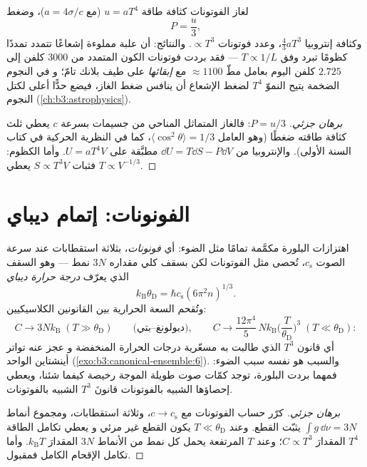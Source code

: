 \begin{proposition}\label{prop:b3:photons-phonons:thermo}
لغاز الفوتونات كثافة طاقة $u = aT^4$ (مع $a =
4\sigma/c$)، وضغط
\[
P = \frac u3 ,
\]
وكثافة إنتروبيا $\tfrac43 aT^3$، وعدد فوتونات $\propto T^3$.
والنتائج: أن علبة مملوءة إشعاعًا تتمدد تمددًا كظومًا
تبرد وفق $T \propto 1/L$ --- فقد بردت فوتونات الكون المتمدد
من $3000$ كلفن إلى $2.725$ كلفن اليوم بعامل مطّ
$\approx1100$ مع \emph{إبقائها} على طيف بلانك تامّ؛ و
في النجوم الضخمة يتيح النموّ $T^4$ لضغط الإشعاع أن ينافس
ضغط الغاز، فيضع حدًّا أعلى لكتل النجوم
(\cref{ch:b3:astrophysics}).
\end{proposition}

\begin{proof}[برهان جزئي]
$P = u/3$: فالغاز المتماثل المناحي من جسيمات بسرعة $c$ يعطي
ثلث كثافة طاقته ضغطًا (وهو العامل $\langle
\cos^2\theta\rangle = 1/3$، كما في النظرية الحركية في كتاب
السنة الأولى). والإنتروبيا من $\dd U = T\dd S - P\dd V$ مطبَّقة على $U =
aT^4V$. وأما الكظوم: فثبات $S \propto T^3V$ يعطي $T \propto
V^{-1/3}$.
\end{proof}

\section{الفونونات: إتمام ديباي}

\begin{theorem}\label{thm:b3:photons-phonons:debye}
اهتزازات البلورة  مكمَّمة تمامًا مثل
الضوء: أي \emph{فونونات}، بثلاثة استقطابات عند سرعة الصوت
$c_{\text{s}}$، تُحصى مثل الفوتونات لكن بسقف كلي مقداره
$3N$ نمط --- وهو السقف الذي يعرّف \emph{درجة حرارة ديباي}
\[
k_{\text{B}}\theta_{\text{D}} = \hbar c_{\text{s}}
(6\pi^2n)^{1/3} .
\]
وتُقحم السعة الحرارية بين القانونين الكلاسيكيين:
\[
C \to 3Nk_{\text{B}} \;(T \gg \theta_{\text{D}})
\qquad\text{(ديولونغ--بتي)} ,
\qquad
C \to \frac{12\pi^4}{5}\,Nk_{\text{B}}
\Big(\frac{T}{\theta_{\text{D}}}\Big)^3
\;(T \ll \theta_{\text{D}}) :
\]
أي قانون $T^3$ الذي طالبت به مسعّرية درجات الحرارة المنخفضة و
عجز عنه تواتر أينشتاين الواحد
(\cref{exo:b3:canonical-ensemble:6}). والسبب هو نفسه
سبب الضوء: فمهما بردت البلورة، توجد كمّات صوت
طويلة الموجة رخيصة كيفما شئنا، ويعطي إحصاؤها الشبيه بالفوتونات
قانونَ $T^3$ الشبيه بالفوتونات.
\end{theorem}

\begin{proof}[برهان جزئي]
كرّر حساب الفوتونات مع $c \to c_{\text{s}}$، وثلاثة
استقطابات، ومجموع أنماط $\int g\,\dd\nu = 3N$ يثبّت
القطع. وعند $T \ll \theta_{\text{D}}$ يكون القطع غير مرئي و
يعطي تكامل الطاقة $T^4$ المقدارَ $C \propto T^3$؛ وعند $T$ المرتفعة يحمل كل
نمط من الأنماط $3N$ المقدارَ $k_{\text{B}}T$. وأما تكامل
الإقحام الكامل فمقبول.
\end{proof}

